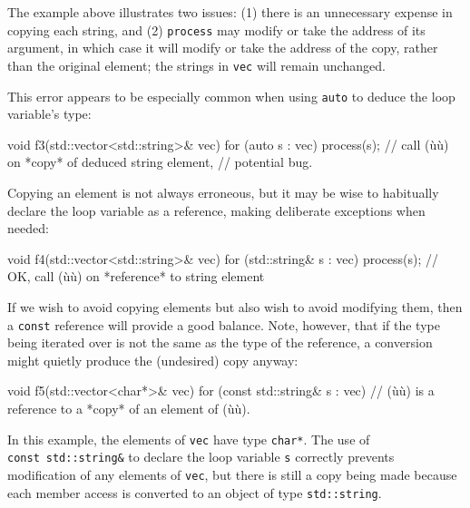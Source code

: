 {{{\noindent The example above illustrates two issues: (1) there is an unnecessary
expense in copying each string, and (2) \lstinline!process! may modify or
take the address of its argument, in which case it will modify or take
the address of the copy, rather than the original element; the strings
in \lstinline!vec! will remain unchanged.

This error appears to be especially common when using \lstinline!auto! to
deduce the loop variable's type:

\begin{emcppslisting}[emcppsbatch=e5]
void f3(std::vector<std::string>& vec)
{
    for (auto s : vec)
    {
        process(s);  // call (ù{}ù) on *copy* of deduced string element,
                     // potential bug.
    }
}
\end{emcppslisting}


\noindent Copying an element is not always erroneous, but it may be wise to
habitually declare the loop variable as a reference, making deliberate
exceptions when needed:

\begin{emcppslisting}[emcppsbatch=e5]
void f4(std::vector<std::string>& vec)
{
    for (std::string& s : vec)
    {
        process(s);  // OK, call (ù{}ù) on *reference* to string element
    }
}
\end{emcppslisting}


\noindent If we wish to avoid copying elements but also wish to avoid modifying
them, then a \lstinline!const! reference will provide a good balance. Note,
however, that if the type being iterated over is not the same as the
type of the reference, a conversion might quietly produce the
(undesired) copy anyway:

\begin{emcppslisting}[emcppsbatch=e5]
void f5(std::vector<char*>& vec)
{
    for (const std::string& s : vec)
    {
        // (ù{}ù) is a reference to a *copy* of an element of (ù{}ù).
    }
}
\end{emcppslisting}


\noindent In this example, the elements of \lstinline!vec! have type \lstinline!char*!.
The use of \lstinline!const!~\lstinline!std::string&! to declare the loop
variable \lstinline!s! correctly prevents modification of any elements of
\lstinline!vec!, but there is still a copy being made because each member
access is converted to an object of type \lstinline!std::string!.

}}}

